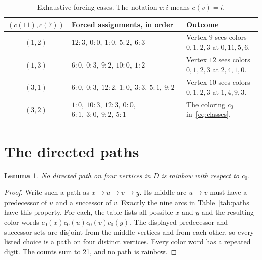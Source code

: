 \documentclass[11pt]{article}
\newtheorem{lemma}{Lemma}
\begin{document}
\begin{table}[t]
\centering
\caption{Exhaustive forcing cases. The notation $v:i$ means $c(v)=i$.}\label{tab:forcing}
\small
\setlength{\tabcolsep}{4pt}
\begin{tabularx}{\textwidth}{@{}c>{\raggedright\arraybackslash}p{}X@{}}
\toprule
$(c(11),c(7))$&Forced assignments, in order&Outcome\\
\midrule
$(1,2)$&$12:3,\ 0:0,\ 1:0,\ 5:2,\ 6:3$&Vertex $9$ sees colors $0,1,2,3$ at $0,11,5,6$.\\[4pt]
$(1,3)$&$6:0,\ 0:3,\ 9:2,\ 10:0,\ 1:2$&Vertex $12$ sees colors $0,1,2,3$ at $2,4,1,0$.\\[4pt]
$(3,1)$&$6:0,\ 0:3,\ 12:2,\ 1:0,\ 3:3,\ 5:1,\ 9:2$&Vertex $10$ sees colors $0,1,2,3$ at $1,4,9,3$.\\[4pt]
$(3,2)$&$1:0,\ 10:3,\ 12:3,\ 0:0,$\newline $6:1,\ 3:0,\ 9:2,\ 5:1$&The coloring $c_0$ in~\eqref{eq:classes}.\\
\bottomrule
\end{tabularx}
\end{table}

\section{The directed paths}
\begin{lemma}\label{lem:paths}
No directed path on four vertices in $D$ is rainbow with respect to $c_0$.
\end{lemma}
\begin{proof}
Write such a path as $x\to u\to v\to y$. Its middle arc $u\to v$ must have a predecessor of $u$ and a successor of $v$. Exactly the nine arcs in Table~\ref{tab:paths} have this property. For each, the table lists all possible $x$ and $y$ and the resulting color words $c_0(x)c_0(u)c_0(v)c_0(y)$. The displayed predecessor and successor sets are disjoint from the middle vertices and from each other, so every listed choice is a path on four distinct vertices. Every color word has a repeated digit. The counts sum to 21, and no path is rainbow.
\end{proof}
\end{document}
